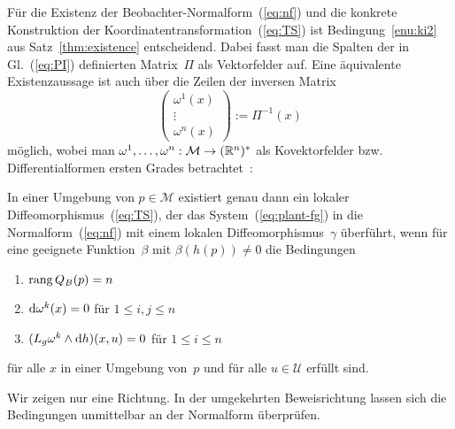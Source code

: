 Für die Existenz der Beobachter-Normalform~(\ref{eq:nf}) und die
konkrete Konstruktion der Koordinatentransformation~(\ref{eq:TS})
ist Bedingung~\ref{enu:ki2} aus Satz~\ref{thm:existence} entscheidend.
Dabei fasst man die Spalten der in Gl.~(\ref{eq:PI}) definierten
Matrix~$\Pi$ als Vektorfelder auf. Eine äquivalente Existenzaussage
ist auch über die Zeilen der inversen Matrix 
\begin{equation}
\left(\begin{array}{c}
\omega^{1}(x)\\
\vdots\\
\omega^{n}(x)
\end{array}\right):=\Pi^{-1}(x)\label{eq:Pinv}
\end{equation}
möglich, wobei man $\omega^{1},\ldots,\omega^{n}:\mathcal{M}\to({\mathbb{R}}^{n})^{*}$
als Kovektorfelder bzw. Differentialformen ersten Grades betrachtet~\cite[Proposition~1]{nam97}:
\begin{theorem}
\label{thm:existence-nam}In einer Umgebung von $p\in\mathcal{M}$
existiert genau dann ein lokaler Diffeomorphismus~(\ref{eq:TS}),
der das System~(\ref{eq:plant-fg}) in die Normalform~(\ref{eq:nf})
mit einem lokalen Diffeomorphismus~$\gamma$ überführt, wenn für
eine geeignete Funktion~$\beta$ mit $\beta(h(p))\neq0$ die Bedingungen
\begin{enumerate}
\item \label{enu:nam1}${\operatorname{rang}}\,Q_{B}(p)=n$

\item \label{enu:nam2}${\mathrm{d}}\omega^{k}(x)=0$ für $1\leq i,j\leq n$
\item \label{enu:nam3}$(L_{g}\omega^{k}\wedge{\mathrm{d}} h)(x,u)=0$ für $1\leq i\leq n$
\end{enumerate}
für alle $x$ in einer Umgebung von~$p$ und für alle $u\in\mathcal{U}$
erfüllt sind. 
\end{theorem}
Wir zeigen nur eine Richtung. In der umgekehrten Beweisrichtung lassen
sich die Bedingungen unmittelbar an der Normalform überprüfen.
